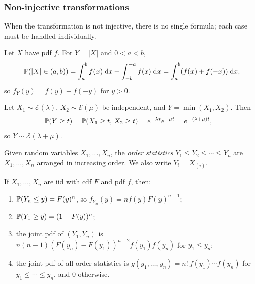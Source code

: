 \documentclass[a4paper]{article}
\begin{document}
\subsubsection*{Non-injective transformations}
When the transformation is not injective, there is no single formula; each case must be handled individually.

\begin{eg}
  Let $X$ have pdf $f$. For $Y = |X|$ and $0 < a < b$,
  \[
    \P(|X| \in (a, b)) = \int_a^b f(x)\;\d x + \int_{-b}^{-a} f(x)\;\d x = \int_a^b (f(x) + f(-x))\;\d x,
  \]
  so $f_Y(y) = f(y) + f(-y)$ for $y > 0$.
\end{eg}

\begin{eg}
  Let $X_1 \sim \mathcal{E}(\lambda)$, $X_2 \sim \mathcal{E}(\mu)$ be independent, and $Y = \min(X_1, X_2)$. Then
  \begin{align*}
    \P(Y \geq t) &= \P(X_1 \geq t,\, X_2 \geq t) = e^{-\lambda t} e^{-\mu t} = e^{-(\lambda + \mu)t},
  \end{align*}
  so $Y \sim \mathcal{E}(\lambda + \mu)$.
\end{eg}

\begin{defi}
  Given random variables $X_1, \dotsc, X_n$, the \emph{order statistics} $Y_1 \leq Y_2 \leq \dotsb \leq Y_n$ are $X_1, \dotsc, X_n$ arranged in increasing order.
  We also write $Y_i = X_{(i)}$.
\end{defi}

\begin{prop}
  If $X_1, \dotsc, X_n$ are iid with cdf $F$ and pdf $f$, then:
  \begin{enumerate}
    \item $\P(Y_n \leq y) = F(y)^n$, so $f_{Y_n}(y) = n f(y) F(y)^{n-1}$;
    \item $\P(Y_1 \geq y) = (1 - F(y))^n$;
    \item the joint pdf of $(Y_1, Y_n)$ is $n(n-1)(F(y_n) - F(y_1))^{n-2} f(y_1) f(y_n)$ for $y_1 \leq y_n$;
    \item the joint pdf of all order statistics is $g(y_1, \dotsc, y_n) = n!\, f(y_1) \dotsm f(y_n)$ for $y_1 \leq \dotsb \leq y_n$, and $0$ otherwise.
  \end{enumerate}
\end{prop}
\end{document}
